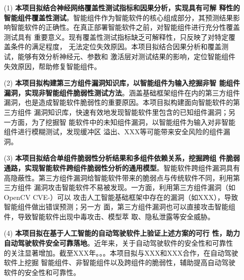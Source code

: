 \begin{itemize}
    \item[(1)]\textbf{本项目拟结合神经网络覆盖性测试指标和因果分析，实现具有可解
    释性的智能组件覆盖性测试}。智能组件作为智能软件的核心组成部分，其预测结果影
    响智能软件的正确性。在真正部署智能软件之前，对智能组件进行充分性覆盖测试具有
    重要意义。现有覆盖性测试指标缺乏可解释性，只反映了对特定覆盖条件的满足程度，
    无法定位失效原因。本项目拟结合因果分析和覆盖测试，能够有效分析神经元、参数和
    激活层对测试结果的影响，定位智能组件失效原因，帮助修复智能组件。
    \item[(2)]\textbf{本项目拟构建第三方组件漏洞知识库，以智能组件为输入挖掘非智
    能组件漏洞，实现非智能组件脆弱性测试方法}。涵盖基础框架组件在内的第三方组件
    漏洞，也是造成智能软件脆弱性的重要原因。本项目拟构建面向智能软件的第三方组件
    漏洞知识库，快速有效地发现智能软件里包含的已知组件漏洞；另一方面，为了挖掘智
    能软件中的未知组件漏洞，以智能组件为输入对非智能组件进行模糊测试，发现缓冲区
    溢出、XXX等可能带来安全风险的组件漏洞。
    \item[(3)]\textbf{本项目拟结合单组件脆弱性分析结果和多组件依赖关系，挖掘跨组
    件脆弱通路，实现智能软件跨组件脆弱性分析的通用模型}。智能软件跨组件漏洞具有
    高隐蔽性。第三方组件漏洞给智能软件带来的脆弱点与传统软件不同，利用第三方组件
    漏洞攻击智能软件不易被发现。一方面，利用第三方组件漏洞（如OpenCV CVE-）可以
    攻击人工智能基础框架中存在的漏洞（如XXX），导致智能组件做出错误预测；另一方
    面，第三方组件漏洞也可以直接攻击智能组件，导致智能软件出现中毒攻击、模型萃
    取、隐私泄露等安全威胁。
    \item[(4)]\textbf{本项目拟在基于人工智能的自动驾驶软件上验证上述方案的可行
    性，助力自动驾驶软件安全可靠落地}。近年来，关于自动驾驶软件的安全性和可靠性
    的关注显著增加。截至XXX年。。。本项目拟与XXX和XXX合作，在自动驾驶软件上挖掘
    智能组件、非智能组件以及跨组件的脆弱性，辅助提高自动驾驶软件的安全性和可靠性。
\end{itemize}


